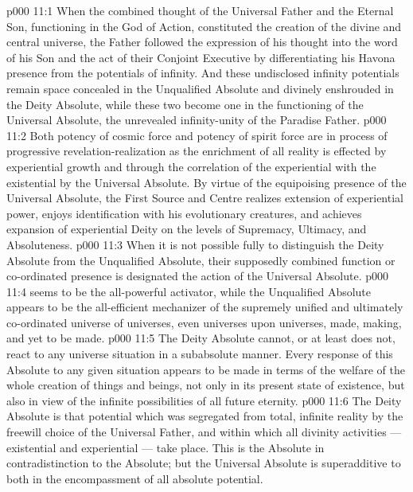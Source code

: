 \vs p000 11:1 When the combined thought of the Universal Father and the Eternal Son, functioning in the God of Action, constituted the creation of the divine and central universe, the Father followed the expression of his thought into the word of his Son and the act of their Conjoint Executive by differentiating his Havona presence from the potentials of infinity. And these undisclosed infinity potentials remain space concealed in the Unqualified Absolute and divinely enshrouded in the Deity Absolute, while these two become one in the functioning of the Universal Absolute, the unrevealed infinity\hyp{}unity of the Paradise Father.
\vs p000 11:2 Both potency of cosmic force and potency of spirit force are in process of progressive revelation\hyp{}realization as the enrichment of all reality is effected by experiential growth and through the correlation of the experiential with the existential by the Universal Absolute. By virtue of the equipoising presence of the Universal Absolute, the First Source and Centre realizes extension of experiential power, enjoys identification with his evolutionary creatures, and achieves expansion of experiential Deity on the levels of Supremacy, Ultimacy, and Absoluteness.
\vs p000 11:3 \pc When it is not possible fully to distinguish the Deity Absolute from the Unqualified Absolute, their supposedly combined function or co\hyp{}ordinated presence is designated the action of the Universal Absolute.
\vs p000 11:4 \bibnobreakspace {} seems to be the all\hyp{}powerful activator, while the Unqualified Absolute appears to be the all\hyp{}efficient mechanizer of the supremely unified and ultimately co\hyp{}ordinated universe of universes, even universes upon universes, made, making, and yet to be made.
\vs p000 11:5 The Deity Absolute cannot, or at least does not, react to any universe situation in a subabsolute manner. Every response of this Absolute to any given situation appears to be made in terms of the welfare of the whole creation of things and beings, not only in its present state of existence, but also in view of the infinite possibilities of all future eternity.
\vs p000 11:6 The Deity Absolute is that potential which was segregated from total, infinite reality by the freewill choice of the Universal Father, and within which all divinity activities --- existential and experiential --- take place. This is the  Absolute in contradistinction to the  Absolute; but the Universal Absolute is superadditive to both in the encompassment of all absolute potential.

